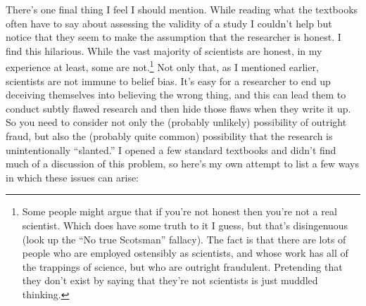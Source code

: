 \documentclass[
]{book}
\begin{document}
There's one final thing I feel I should mention. While reading what the textbooks often have to say about assessing the validity of a study I couldn't help but notice that they seem to make the assumption that the researcher is honest. I find this hilarious. While the vast majority of scientists are honest, in my experience at least, some are not.\footnote{Some people might argue that if you're not honest then you're not a real scientist. Which does have some truth to it I guess, but that's disingenuous (look up the ``No true Scotsman'' fallacy). The fact is that there are lots of people who are employed ostensibly as scientists, and whose work has all of the trappings of science, but who are outright fraudulent. Pretending that they don't exist by saying that they're not scientists is just muddled thinking.} Not only that, as I mentioned earlier, scientists are not immune to belief bias. It's easy for a researcher to end up deceiving themselves into believing the wrong thing, and this can lead them to conduct subtly flawed research and then hide those flaws when they write it up. So you need to consider not only the (probably unlikely) possibility of outright fraud, but also the (probably quite common) possibility that the research is unintentionally ``slanted.'' I opened a few standard textbooks and didn't find much of a discussion of this problem, so here's my own attempt to list a few ways in which these issues can arise:
\end{document}
